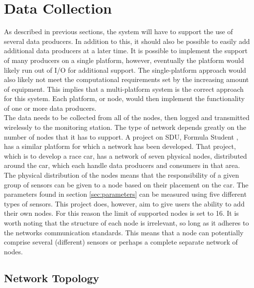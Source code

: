 
\section{Data Collection}
\label{sec:data_collection}
As described in previous sections, the system will have to support the use of several data producers.
In addition to this, it should also be possible to easily add additional data producers at a later time.
It is possible to implement the support of many producers on a single platform, however, eventually the platform would likely run out of I/O for additional support.
The single-platform approach would also likely not meet the computational requirements set by the increasing amount of equipment.
This implies that a multi-platform system is the correct approach for this system.
Each platform, or node, would then implement the functionality of one or more data producers.\\
The data needs to be collected from all of the nodes, then logged and transmitted wirelessly to the monitoring station.
The type of network depends greatly on the number of nodes that it has to support.
A project on SDU, Formula Student \cite{formulastudent}, has a similar platform for which a network has been developed.
That project, which is to develop a race car, has a network of seven physical nodes, distributed around the car, which each handle data producers and consumers in that area.
The physical distribution of the nodes means that the responsibility of a given group of sensors can be given to a node based on their placement on the car.
The parameters found in section \ref{sec:parameters} can be measured using five different types of sensors.
This project does, however, aim to give users the ability to add their own nodes.
For this reason the limit of supported nodes is set to 16.
It is worth noting that the structure of each node is irrelevant, so long as it adheres to the networks communication standards.
This means that a node can potentially comprise several (different) sensors or perhaps a complete separate network of nodes.

\subsection{Network Topology}

